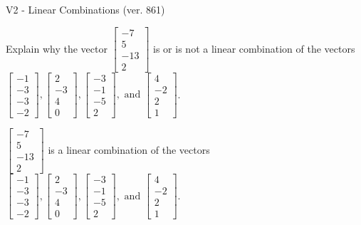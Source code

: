 \begin{exercise}
  \begin{exerciseTitle}V2 - Linear Combinations (ver. 861)\end{exerciseTitle}
  \begin{exerciseStatement}
    Explain why the vector \(\left[\begin{array}{c}
-7 \\
5 \\
-13 \\
2
\end{array}\right]\)  is or is not a linear 
	combination of the vectors \(\left[\begin{array}{c}
-1 \\
-3 \\
-3 \\
-2
\end{array}\right] , \left[\begin{array}{c}
2 \\
-3 \\
4 \\
0
\end{array}\right] , \left[\begin{array}{c}
-3 \\
-1 \\
-5 \\
2
\end{array}\right] , \text{ and } \left[\begin{array}{c}
4 \\
-2 \\
2 \\
1
\end{array}\right]\).
	


  \end{exerciseStatement}
  \begin{exerciseAnswer}
   \(\left[\begin{array}{c}
-7 \\
5 \\
-13 \\
2
\end{array}\right]\) 
  	 is  
	a linear combination of the vectors \(\left[\begin{array}{c}
-1 \\
-3 \\
-3 \\
-2
\end{array}\right] , \left[\begin{array}{c}
2 \\
-3 \\
4 \\
0
\end{array}\right] , \left[\begin{array}{c}
-3 \\
-1 \\
-5 \\
2
\end{array}\right] , \text{ and } \left[\begin{array}{c}
4 \\
-2 \\
2 \\
1
\end{array}\right]\).


\end{exerciseAnswer}
\end{exercise}
